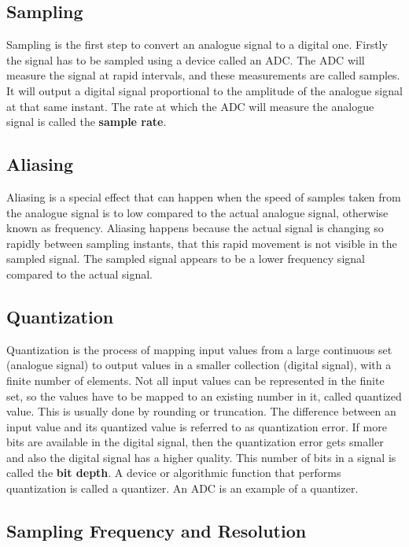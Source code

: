 \subsection{Sampling}
\label{sub:Sampling}

Sampling is the first step to convert an analogue signal to a digital one. Firstly the signal has to be sampled using a device called an \gls{ADC}. The \gls{ADC} will measure the signal at rapid intervals, and these measurements are called samples. It will output a digital signal proportional to the amplitude of the analogue signal at that same instant. The rate at which the \gls{ADC} will measure the analogue signal is called the \textbf{sample rate}.

\subsection{Aliasing}
\label{sub:Aliasing}

Aliasing is a special effect that can happen when the speed of samples taken from the analogue signal is to low compared to the actual analogue signal, otherwise known as frequency. Aliasing happens because the actual signal is changing so rapidly between sampling instants, that this rapid movement is not visible in the sampled signal. The sampled signal appears to be a lower frequency signal compared to the actual signal.

\subsection{Quantization}
\label{sub:Quantization}

Quantization is the process of mapping input values from a large continuous set (analogue signal) to output values in a smaller collection (digital signal), with a finite number of elements. Not all input values can be represented in the finite set, so the values have to be mapped to an existing number in it, called quantized value. This is usually done by rounding or truncation. The difference between an input value and its quantized value is referred to as quantization error.  If more bits are available in the digital signal, then the quantization error gets smaller and also the digital signal has a higher quality. This number of bits in a signal is called the \textbf{bit depth}. A device or algorithmic function that performs quantization is called a quantizer. An \gls{ADC} is an example of a quantizer. 

\subsection{Sampling Frequency and Resolution}
\label{sub:Sampling-Frequency-Resolution}

